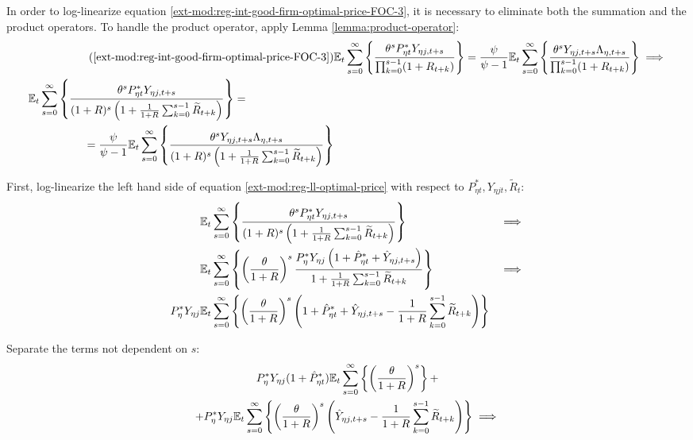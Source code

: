 \documentclass[../thesis.tex]{subfiles}
\begin{document}
In order to log-linearize equation \ref{ext-mod:reg-int-good-firm-optimal-price-FOC-3}, it is necessary to eliminate both the summation and the product operators. To handle the product operator, apply Lemma \ref{lemma:product-operator}:
\begin{align}
	\tag{\ref{ext-mod:reg-int-good-firm-optimal-price-FOC-3}}
	& \E \sum_{s=0}^{\infty} \left\{ \frac{\theta^s P_{\eta t}^{\ast} Y_{\eta j,t+s}}{ \prod_{k=0}^{s-1}(1+R_{t+k})} \right\} = \frac{\psi}{\psi-1} \E \sum_{s=0}^{\infty} \left\{ \frac{\theta^s Y_{\eta j,t+s} \Lambda_{\eta, t+s}}{\prod_{k=0}^{s-1}(1+R_{t+k})} \right\} \implies
	\\
	\begin{split}
		& \E \sum_{s=0}^{\infty} \left\{ \frac{\theta^s P_{\eta t}^{\ast} Y_{\eta j,t+s}}{ (1 + R)^s \left( 1 + \frac{1}{1 + R} \sum_{k=0}^{s-1} \widetilde{R}_{t+k} \right)} \right\} = 
		\\ & \quad \quad \quad \quad \quad = \frac{\psi}{\psi-1} \E \sum_{s=0}^{\infty} \left\{ \frac{\theta^s Y_{\eta j,t+s} \Lambda_{\eta, t+s}}{ (1 + R)^s \left( 1 + \frac{1}{1 + R} \sum_{k=0}^{s-1} \widetilde{R}_{t+k} \right)} \right\} \label{ext-mod:reg-ll-optimal-price}
	\end{split}
\end{align}

First, log-linearize the left hand side of equation \ref{ext-mod:reg-ll-optimal-price} with respect to \( P_{\eta t}^{\ast}, Y_{\eta j t}, \widetilde{R}_t \):
\begin{alignat}{2}
	& {\mathbb{E}_{t}} \sum_{s=0}^{\infty} \left\{ \frac{\theta^s P_{\eta t}^{\ast} Y_{\eta j,t+s}}{ (1 + R)^s \left( 1 + \frac{1}{1 + R} \sum_{k=0}^{s-1} \widetilde{R}_{t+k} \right)} \right\} &\implies \nonumber \\
	& {\mathbb{E}_{t}} \sum_{s=0}^{\infty} \left\{ \left( \frac{\theta}{1 + R} \right)^s  \frac{ P_{\eta}^{\ast} Y_{\eta j} \left( 1 + \hat{P}_{\eta t}^{\ast} + \hat{Y}_{\eta j, t+s} \right)}{ 1 + \frac{1}{1 + R} \sum_{k=0}^{s-1} \widetilde{R}_{t+k}} \right\} &\implies \nonumber \\
	P_{\eta}^{\ast} Y_{\eta j} &{\mathbb{E}_{t}} \sum_{s=0}^{\infty} \left\{ \left( \frac{\theta}{1 + R} \right)^s \left( 1 + \hat{P}_{\eta t}^{\ast} + \hat{Y}_{\eta j, t+s} - \frac{1}{1 + R} \sum_{k=0}^{s-1} \widetilde{R}_{t+k} \right) \right\} & \nonumber
\end{alignat}

Separate the terms not dependent on $s$:
\begin{multline}
	P_{\eta}^{\ast} Y_{\eta j} ( 1 + \hat{P}_{\eta t}^{\ast} ) {\mathbb{E}_{t}} \sum_{s=0}^{\infty} \left\{ \left( \frac{\theta}{1 + R} \right)^s \right\} + \\
	+ P_{\eta}^{\ast} Y_{\eta j} {\mathbb{E}_{t}} \sum_{s=0}^{\infty} \left\{ \left( \frac{\theta}{1 + R} \right)^s \left( \hat{Y}_{\eta j, t+s} - \frac{1}{1 + R} \sum_{k=0}^{s-1} \widetilde{R}_{t+k} \right) \right\} \implies \nonumber
\end{multline}
\end{document}
